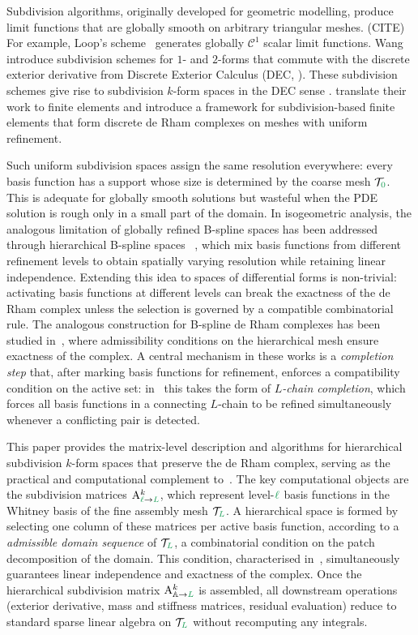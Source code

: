 \documentclass[a4paper, 12pt]{article}
\newcommand{\highlight}[1]{{\color{cyan} #1}}
\newcommand{\needcite}{\highlight{(CITE)}} %
\newcommand{\guidance}[1]{{\color{lime!70!black} #1}}
\newcommand{\green}{\color{ForestGreen}}
\newcommand{\T}{\mathcal{T}}
\renewcommand{\l}{{\green\ell}}
\renewcommand{\L}{{\green L}}
\newcommand{\lzero}{{\green 0}}
\newcommand{\Amat}[3]{\mathbf{\mathrm{A}}^{#1}_{#2 \to #3}}
\newcommand{\activeDoFs}{\mathbb{A}}
\theoremstyle{definition}
\theoremstyle{plain}
\numberwithin{equation}{section}
\begin{document}
Subdivision algorithms, originally developed for geometric modelling, produce limit functions that are globally smooth on arbitrary triangular meshes.\needcite{} For example, Loop's scheme~\citep{Loop.1987} generates globally $\mathcal{C}^1$ scalar limit functions. Wang~\citep{Wang.2006,Wang.2008} introduce subdivision schemes for $1$- and $2$-forms that commute with the discrete exterior derivative from Discrete Exterior Calculus (DEC, \cite{Hirani.2003,Desbrun.2006}). These subdivision schemes give rise to subdivision $k$-form spaces in the DEC sense \citep{Goes.2016}. \cite{Piel.2026} translate their work to finite elements and introduce a framework for subdivision-based finite elements that form discrete de Rham complexes on meshes with uniform refinement.

Such uniform subdivision spaces assign the same resolution everywhere: every basis function has a support whose size is determined by the coarse mesh $\T_\lzero$. This is adequate for globally smooth solutions but wasteful when the PDE solution is rough only in a small part of the domain. In isogeometric analysis, the analogous limitation of globally refined B-spline spaces has been addressed through hierarchical B-spline spaces~\guidance{\citep{Vuong.2011,Evans.2020}}, which mix basis functions from different refinement levels to obtain spatially varying resolution while retaining linear independence. Extending this idea to spaces of differential forms is non-trivial: activating basis functions at different levels can break the exactness of the de Rham complex unless the selection is governed by a compatible combinatorial rule.
The analogous construction for B-spline de Rham complexes has been studied in~\cite{Buffa2011,Evans.2020,Shepherd.2024,Dijkstra.2025}, where admissibility conditions on the hierarchical mesh ensure exactness of the complex.
A central mechanism in these works is a \emph{completion step} that, after marking basis functions for refinement, enforces a compatibility condition on the active set: in~\cite{Cabanas.2026} this takes the form of \emph{$L$-chain completion}, which forces all basis functions in a connecting $L$-chain to be refined simultaneously whenever a conflicting pair is detected.

This paper provides the matrix-level description and algorithms for hierarchical subdivision $k$-form spaces that preserve the de Rham complex, serving as the practical and computational complement to~\cite{companion_paper}. The key computational objects are the subdivision matrices $\Amat{k}{\l}{\L}$, which represent level-$\l$ basis functions in the Whitney basis of the fine assembly mesh $\T_\L$. A hierarchical space is formed by selecting one column of these matrices per active basis function, according to a \emph{admissible domain sequence} of $\T_\L$, a combinatorial condition on the patch decomposition of the domain. This condition, characterised in~\cite{companion_paper}, simultaneously guarantees linear independence and exactness of the complex. Once the hierarchical subdivision matrix $\Amat{k}{\activeDoFs}{\L}$ is assembled, all downstream operations (exterior derivative, mass and stiffness matrices, residual evaluation) reduce to standard sparse linear algebra on $\T_\L$ without recomputing any integrals.
\end{document}
